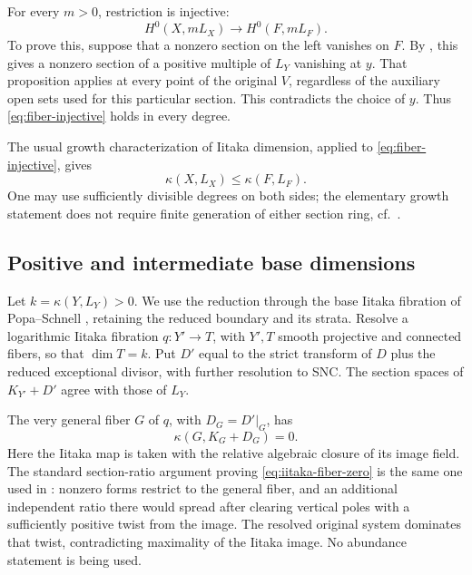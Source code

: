 For every $m>0$, restriction is injective:
\begin{equation}\label{eq:fiber-injective}
 H^0(X,mL_X)\longrightarrow H^0(F,mL_F).
\end{equation}
To prove this, suppose that a nonzero section on the left vanishes on $F$.
By , this gives a nonzero section of a
positive multiple of $L_Y$ vanishing at $y$. That proposition applies at
every point of the original $V$, regardless of the auxiliary open sets
used for this particular section. This contradicts the choice of
$y$. Thus \eqref{eq:fiber-injective} holds in every degree.

The usual growth characterization of Iitaka dimension, applied to
\eqref{eq:fiber-injective}, gives
\begin{equation}\label{eq:zero-base-bound}
 \kappa(X,L_X)\leq\kappa(F,L_F).
\end{equation}
One may use sufficiently divisible degrees on both sides; the elementary
growth statement does not require finite generation of either section
ring, cf.\ \cite[Section~2.1]{Lazarsfeld}.

\subsection{Positive and intermediate base dimensions}

Let $k=\kappa(Y,L_Y)>0$. We use the reduction through the base Iitaka
fibration of Popa--Schnell \cite[\S2, Step~2]{PopaSchnellSmooth}, retaining
the reduced boundary and its strata. Resolve a logarithmic Iitaka fibration
$q\colon Y'\to T$, with $Y',T$ smooth projective and connected fibers, so
that $\dim T=k$. Put $D'$ equal to the strict transform of $D$ plus the
reduced exceptional divisor, with further resolution to SNC. The section
spaces of $K_{Y'}+D'$ agree with those of $L_Y$.

The very general fiber $G$ of $q$, with $D_G=D'|_G$, has
\begin{equation}\label{eq:iitaka-fiber-zero}
 \kappa(G,K_G+D_G)=0.
\end{equation}
Here the Iitaka map is taken with the relative algebraic closure of its
image field. The standard section-ratio argument proving
\eqref{eq:iitaka-fiber-zero} is the same one used in
: nonzero forms restrict to the general fiber,
and an additional independent ratio there would spread after clearing
vertical poles with a sufficiently positive twist from the image. The
resolved original system dominates that twist, contradicting maximality
of the Iitaka image. No abundance statement is being used.

